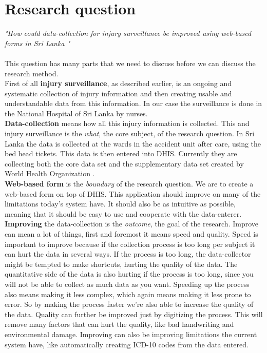 \documentclass[UKenglish, 12pt]{article}
\newcommand{\WHO}{World Health Organization }
\newcommand{\RQ}{How could data-collection for injury surveillance be improved
using web-based forms in Sri Lanka }
\newcommand{\is}{injury surveillance}
\begin{document}
\newpage \section*{Research question} 
\textit{"\RQ"} \\\\ This question has
many parts that we need to discuss before we can discuss the research
method.\\

First of all \textbf{\is}, as described earlier, is an ongoing and
systematic collection of injury information and then creating usable and
understandable data from this information. In our case the surveillance is done
in the National Hospital of Sri Lanka by nurses. \\

\textbf{Data-collection} means how all this injury information is
collected. This and injury surveillance is the \textit{what}, the core subject, of the
research question. In Sri Lanka the data is collected at the wards in the
accident unit after care, using the bed head tickets. This data is then entered
into DHIS. Currently they are collecting both the core data set and the
supplementary data set created by \WHO.\\

\textbf{Web-based form} is the \textit{boundary} of the research question. We are to
create a web-based form on top of DHIS. This application should improve on many
of the limitations today's system have. It should also be as intuitive as
possible, meaning that it should be easy to use and cooperate with the
data-enterer.\\

\textbf{Improving} the data-collection is the \textit{outcome}, the goal of the
research. Improve can mean a lot of things, first and foremost it means speed
and quality. Speed is important to improve because if the collection process is
too long per subject it can hurt the data in several ways. If the process is too
long, the data-collector might be tempted to make shortcuts, hurting the quality
of the data. The quantitative side of the data is also hurting if the process
is too long, since you will not be able to collect as much data as you want.
Speeding up the process also means making it less complex, which again means
making it less prone to error. So by making the process faster we're also able
to increase the quality of the data.  Quality can further be improved just by
digitizing the process. This will remove many factors that can hurt the quality,
like bad handwriting and environmental damage.
Improving can also be improving limitations the current system have, like
automatically creating ICD-10 codes from the data entered.\\
\end{document}
